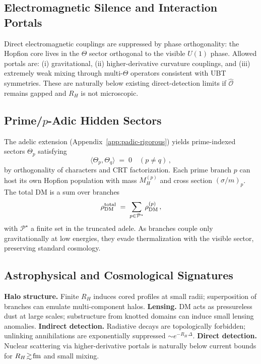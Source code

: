 \documentclass[12pt,a4paper]{article}
\numberwithin{equation}{section}
\theoremstyle{definition}
\theoremstyle{remark}
\begin{document}
\subsection{Electromagnetic Silence and Interaction Portals}
Direct electromagnetic couplings are suppressed by phase orthogonality: the Hopfion core lives in the $\Theta$ sector orthogonal to the visible $U(1)$ phase.
Allowed portals are: (i) gravitational, (ii) higher-derivative curvature couplings, and (iii) extremely weak mixing through multi-$\Theta$ operators consistent with UBT symmetries.
These are naturally below existing direct-detection limits if $\hat{\mathcal{O}}$ remains gapped and $R_H$ is not microscopic.

\subsection{Prime/$p$-Adic Hidden Sectors}
The adelic extension (Appendix~\ref{app:padic-rigorous}) yields prime-indexed sectors $\Theta_p$ satisfying
\begin{equation}
\langle \Theta_p,\Theta_q\rangle \;=\; 0 \quad (p\neq q)\,,
\end{equation}
by orthogonality of characters and CRT factorization.
Each prime branch $p$ can host its own Hopfion population with mass $M_H^{(p)}$ and cross section $(\sigma/m)_p$.
The total DM is a sum over branches
\begin{equation}
\rho_{\rm DM}^{\rm total} \;=\; \sum_{p\in\mathcal{P}^\star}\rho_{\rm DM}^{(p)} \,,
\end{equation}
with $\mathcal{P}^\star$ a finite set in the truncated adele. As branches couple only gravitationally at low energies, they evade thermalization with the visible sector, preserving standard cosmology.

\subsection{Astrophysical and Cosmological Signatures}
\textbf{Halo structure.} Finite $R_H$ induces cored profiles at small radii; superposition of branches can emulate multi-component halos.
\textbf{Lensing.} DM acts as pressureless dust at large scales; substructure from knotted domains can induce small lensing anomalies.
\textbf{Indirect detection.} Radiative decays are topologically forbidden; unlinking annihilations are exponentially suppressed $\sim e^{-R_H\,\Delta}$.
\textbf{Direct detection.} Nuclear scattering via higher-derivative portals is naturally below current bounds for $R_H\!\gtrsim\!{\rm fm}$ and small mixing.
\end{document}
